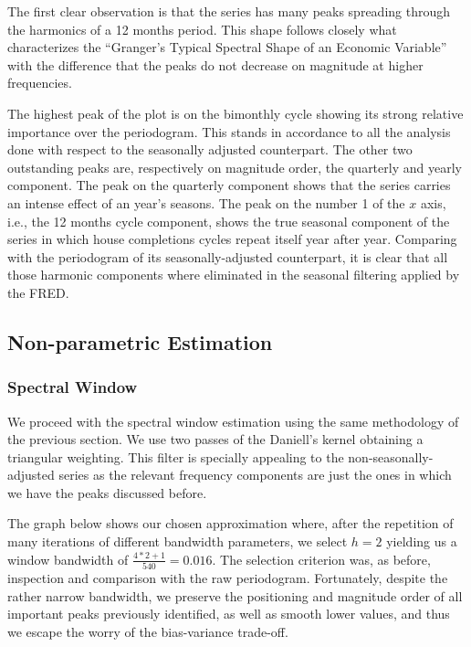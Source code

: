 \documentclass[12pt]{article} %
\begin{document}
The first clear observation is that the series has many peaks spreading through the harmonics of a 12 months period. This shape follows closely what characterizes the ``Granger's Typical Spectral Shape of an Economic Variable'' \citep{granger66} with the difference that the peaks do not decrease on magnitude at higher frequencies. 

The highest peak of the plot is on the bimonthly cycle showing its strong relative importance over the periodogram. This stands in accordance to all the analysis done with respect to the seasonally adjusted counterpart. The other two outstanding peaks are, respectively on magnitude order, the quarterly and yearly component. The peak on the quarterly component shows that the series carries an intense effect of an year's seasons. The peak on the number 1 of the $x$ axis, i.e., the 12 months cycle component, shows the true seasonal component of the series in which house completions cycles repeat itself year after year. Comparing with the periodogram of its seasonally-adjusted counterpart, it is clear that all those harmonic components where eliminated in the seasonal filtering applied by the FRED.


\subsection{Non-parametric Estimation}

\subsubsection{Spectral Window}

We proceed with the spectral window estimation using the same methodology of the previous section. We use two passes of the Daniell's kernel obtaining a triangular weighting. This filter is specially appealing to the non-seasonally-adjusted series as the relevant frequency components are just the ones in which we have the peaks discussed before. 

The graph below shows our chosen approximation where, after the repetition of many iterations of different bandwidth parameters, we select $h=2$ yielding us a window bandwidth of $\frac{4*2+1}{540} = 0.016$. The selection criterion was, as before, inspection and comparison with the raw periodogram. Fortunately, despite the rather narrow bandwidth, we preserve the positioning and magnitude order of all important peaks previously identified, as well as smooth lower values, and thus we escape the worry of the bias-variance trade-off.
\end{document}
